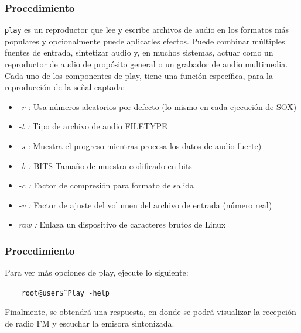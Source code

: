 \begin{frame}
\frametitle{Procedimiento}

\texttt{play} es un reproductor que lee y escribe archivos de audio en los formatos más populares y opcionalmente puede aplicarles efectos. Puede combinar múltiples fuentes de entrada, sintetizar audio y, en muchos sistemas, actuar como un reproductor de audio de propósito general o un grabador de audio multimedia. \\
\vspace{2mm }
Cada uno de los componentes de play, tiene una función específica, para la reproducción de la señal captada:

\begin{itemize}
    \item {\textit{-r : } Usa números aleatorios por defecto (lo mismo en cada ejecución de SOX)}
    \item {\textit{-t : } Tipo de archivo de audio FILETYPE}
    \item {\textit{-s : } Muestra el progreso mientras procesa los datos de audio fuerte)}
    \item {\textit{-b : } BITS Tamaño de muestra codificado en bits}
    \item {\textit{-c : } Factor de compresión para formato de salida}
    \item {\textit{-v : } Factor de ajuste del volumen del archivo de entrada (número real)}
    \item {\textit{raw : } Enlaza un dispositivo de caracteres brutos de Linux}
\end{itemize}


\end{frame}

\begin{frame}
\frametitle{Procedimiento}

Para ver más opciones de play, ejecute lo siguiente:

\begin{block}{}
  \texttt{
  \ \ \ root@user\~\$ Play {-}help}
\end{block} 

Finalmente, se obtendrá una respuesta, en donde se podrá visualizar la recepción de radio FM y escuchar la emisora sintonizada.

\end{frame}


